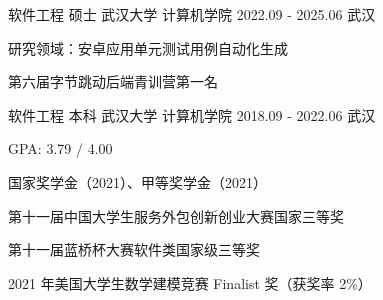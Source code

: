 

\begin{cventries}

  \cventry
    {软件工程 \quad 硕士} %
    {武汉大学 \quad 计算机学院} %
    {2022.09 - 2025.06} %
    {武汉} %
    {
      \begin{cvitems} %
        \item {研究领域：安卓应用单元测试用例自动化生成}
        \item {第六届字节跳动后端青训营第一名}
      \end{cvitems}
    }

  \cventry
    {软件工程 \quad 本科} %
    {武汉大学 \quad 计算机学院} %
    {2018.09 - 2022.06} %
    {武汉} %
    {
      \begin{cvitems} %
        \item {GPA: 3.79 / 4.00}
        \item {国家奖学金（2021）、甲等奖学金（2021）}
        \item {第十一届中国大学生服务外包创新创业大赛国家三等奖}
        \item {第十一届蓝桥杯大赛软件类国家级三等奖}
        \item {2021 年美国大学生数学建模竞赛 Finalist 奖（获奖率 2\%）}
      \end{cvitems}
    }

\end{cventries}
